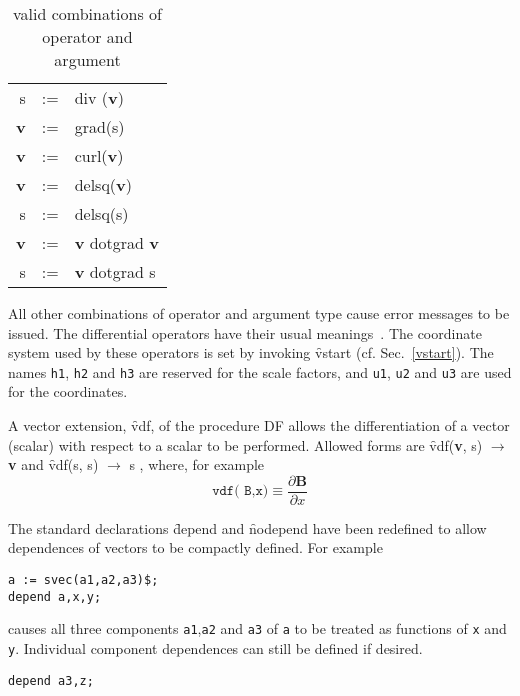 \begin{table}[!tbp]
\begin{center}
\begin{tabular}{rcl}
s & := & div (\textbf{v})  \\
\textbf{v} & := & grad(s) \\
\textbf{v} & := & curl(\textbf{v})  \\
\textbf{v} & := & delsq(\textbf{v}) \\
 s  & := & delsq(s) \\
\textbf{v} & := & \textbf{v}  dotgrad \textbf{v}  \\
 s & := & \textbf{v}  dotgrad  s 
\end{tabular}
\end{center}
\caption{ valid combinations of operator and argument}\label{vvecttable}
\end{table}

All other combinations of operator and argument type cause error
messages to be issued.  The differential operators have their usual
meanings~\cite{Spiegel:59}.  The coordinate system used by these operators is
set by invoking  \f{vstart} (cf. Sec.~\ref{vstart}).  The names \texttt{h1}, 
\texttt{h2}  and \texttt{h3} are
reserved for the scale factors, and \texttt{u1}, \texttt{u2} and \texttt{u3} are 
used for the coordinates.

A vector extension, \f{vdf}, of the \REDUCE procedure DF allows the 
differentiation of a vector (scalar) with respect to a scalar to be
performed.  Allowed forms are 
\hypertarget{operator:VDF}{}
\f{vdf}(\textbf{v}, s)  $\rightarrow$  \textbf{v}   and
\f{vdf}(s, s)  $\rightarrow$   s , 
where, for example
\begin{equation*}
\texttt{vdf( B,x)} \equiv \frac{\partial \textbf{B}}{\partial x}
\end{equation*}

The standard \REDUCE declarations \f{depend} and \f{nodepend} have been redefined
to allow dependences of vectors to be compactly
defined.  For example 
\begin{verbatim}
a := svec(a1,a2,a3)$;
depend a,x,y;
\end{verbatim}
causes all three components \texttt{a1},\texttt{a2} and \texttt{a3} of \texttt{a} 
to be treated as functions of \texttt{x} and \texttt{y}.
Individual component dependences can still be defined if desired.
\begin{verbatim}
depend a3,z;
\end{verbatim}


